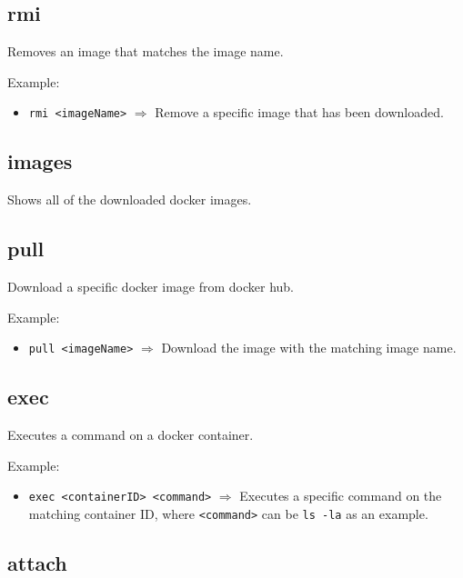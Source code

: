 \documentclass[a4paper, 12pt]{article}
\begin{document}
\subsection{rmi}

Removes an image that matches the image name.

\vspace{0.5em}
Example:
\begin{itemize}
	\item \texttt{rmi <imageName>} $\Rightarrow$ Remove a specific image that
	has been downloaded.
\end{itemize}

\subsection{images}

Shows all of the downloaded docker images.

\subsection{pull}

Download a specific docker image from docker hub.

\vspace{0.5em}
Example:
\begin{itemize}
	\item \texttt{pull <imageName>} $\Rightarrow$ Download the image with the
	matching image name.
\end{itemize}

\subsection{exec}

Executes a command on a docker container.

\vspace{0.5em}
Example:
\begin{itemize}
	\item \texttt{exec <containerID> <command>} $\Rightarrow$ Executes a
	specific command on the matching container ID, where \texttt{<command>} can
	be \texttt{ls -la} as an example.
\end{itemize}

\subsection{\label{sec:attach}attach}
\end{document}
